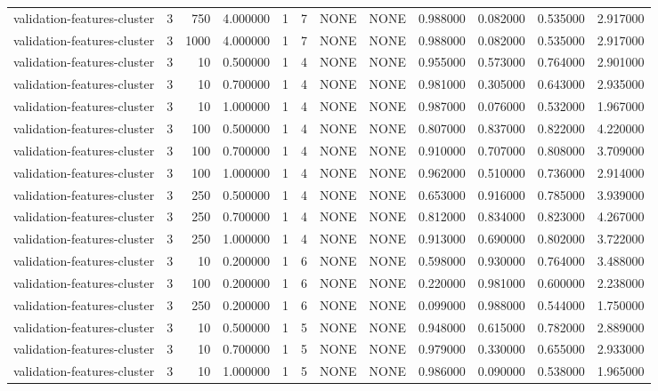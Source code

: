 \begin{tabular}{lrrrllllrrrr}
validation-features-cluster & 3 & 750 & 4.000000 & 1 & 7 & NONE & NONE & 0.988000 & 0.082000 & 0.535000 & 2.917000 \\
validation-features-cluster & 3 & 1000 & 4.000000 & 1 & 7 & NONE & NONE & 0.988000 & 0.082000 & 0.535000 & 2.917000 \\
validation-features-cluster & 3 & 10 & 0.500000 & 1 & 4 & NONE & NONE & 0.955000 & 0.573000 & 0.764000 & 2.901000 \\
validation-features-cluster & 3 & 10 & 0.700000 & 1 & 4 & NONE & NONE & 0.981000 & 0.305000 & 0.643000 & 2.935000 \\
validation-features-cluster & 3 & 10 & 1.000000 & 1 & 4 & NONE & NONE & 0.987000 & 0.076000 & 0.532000 & 1.967000 \\
validation-features-cluster & 3 & 100 & 0.500000 & 1 & 4 & NONE & NONE & 0.807000 & 0.837000 & 0.822000 & 4.220000 \\
validation-features-cluster & 3 & 100 & 0.700000 & 1 & 4 & NONE & NONE & 0.910000 & 0.707000 & 0.808000 & 3.709000 \\
validation-features-cluster & 3 & 100 & 1.000000 & 1 & 4 & NONE & NONE & 0.962000 & 0.510000 & 0.736000 & 2.914000 \\
validation-features-cluster & 3 & 250 & 0.500000 & 1 & 4 & NONE & NONE & 0.653000 & 0.916000 & 0.785000 & 3.939000 \\
validation-features-cluster & 3 & 250 & 0.700000 & 1 & 4 & NONE & NONE & 0.812000 & 0.834000 & 0.823000 & 4.267000 \\
validation-features-cluster & 3 & 250 & 1.000000 & 1 & 4 & NONE & NONE & 0.913000 & 0.690000 & 0.802000 & 3.722000 \\
validation-features-cluster & 3 & 10 & 0.200000 & 1 & 6 & NONE & NONE & 0.598000 & 0.930000 & 0.764000 & 3.488000 \\
validation-features-cluster & 3 & 100 & 0.200000 & 1 & 6 & NONE & NONE & 0.220000 & 0.981000 & 0.600000 & 2.238000 \\
validation-features-cluster & 3 & 250 & 0.200000 & 1 & 6 & NONE & NONE & 0.099000 & 0.988000 & 0.544000 & 1.750000 \\
validation-features-cluster & 3 & 10 & 0.500000 & 1 & 5 & NONE & NONE & 0.948000 & 0.615000 & 0.782000 & 2.889000 \\
validation-features-cluster & 3 & 10 & 0.700000 & 1 & 5 & NONE & NONE & 0.979000 & 0.330000 & 0.655000 & 2.933000 \\
validation-features-cluster & 3 & 10 & 1.000000 & 1 & 5 & NONE & NONE & 0.986000 & 0.090000 & 0.538000 & 1.965000 \\

\end{tabular}
